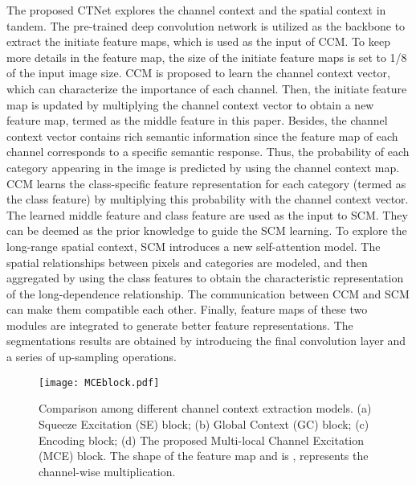 \documentclass[10pt,journal,cspaper,compsoc]{IEEEtran}
\begin{document}
The proposed CTNet explores the channel context and the spatial context in tandem. The pre-trained deep convolution network is utilized as the backbone to extract the initiate feature maps, which is used as the input of CCM. To keep more details in the feature map, the size of the initiate feature maps is set to 1/8 of the input image size. CCM is proposed to learn the channel context vector, which can characterize the importance of each channel. Then, the initiate feature map is updated by multiplying the channel context vector to obtain a new feature map, termed as the middle feature in this paper. Besides, the channel context vector contains rich semantic information since the feature map of each channel corresponds to a specific semantic response. Thus, the probability of each category appearing in the image is predicted by using the channel context map. CCM learns the class-specific feature representation for each category (termed as the class feature) by multiplying this probability with the channel context vector. The learned middle feature and class feature are used as the input to SCM. They can be deemed as the prior knowledge to guide the SCM learning. To explore the long-range spatial context, SCM introduces a new self-attention model. The spatial relationships between pixels and categories are modeled, and then aggregated by using the class features to obtain the characteristic representation of the long-dependence relationship. The communication between CCM and SCM can make them compatible each other. Finally, feature maps of these two modules are integrated to generate better feature representations. The segmentations results are obtained by introducing the final convolution layer and a series of up-sampling operations.
	
\begin{figure}
\centering
\texttt{[image: MCEblock.pdf]}
\caption{Comparison among different channel context extraction models. (a) Squeeze Excitation (SE) block; (b) Global Context (GC) block; (c) Encoding block; (d) The proposed Multi-local Channel Excitation (MCE) block. The shape of the feature map  and  is ,  represents the channel-wise multiplication.}
\label{fig3}
\vspace {-4mm}
\end{figure}
	
\end{document}
